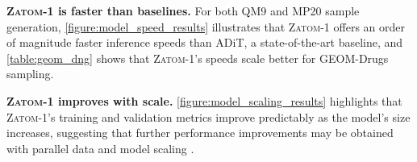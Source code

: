 \documentclass{article}
\theoremstyle{plain}
\theoremstyle{definition}
\theoremstyle{remark}
\begin{document}
\textbf{\textsc{Zatom-1} is faster than baselines.} For both QM9 and MP20 sample generation, \cref{figure:model_speed_results} illustrates that \textsc{Zatom-1} offers an order of magnitude faster inference speeds than ADiT, a state-of-the-art baseline, and \cref{table:geom_dng} shows that \textsc{Zatom-1}'s speeds scale better for GEOM-Drugs sampling.

\textbf{\textsc{Zatom-1} improves with scale.} \cref{figure:model_scaling_results} highlights that \textsc{Zatom-1}'s training and validation metrics improve predictably as the model's size increases, suggesting that further performance improvements may be obtained with parallel data and model scaling \citep{kaplan2020scaling}.


\begin{table}[!ht]
\caption{\textbf{Molecule generation results on GEOM-DRUGS.}
\label{table:geom_dng}
\textit{Left:} Validity, uniqueness, and \% pass rates on PoseBusters for 10,000 sampled molecules.
\textsc{Zatom-1}, using minimal inductive biases, matches or exceeds state-of-the-art equivariant and latent diffusion baselines, which explicitly predict atomic bonds or generate samples using latent autoencoder embeddings, and generates more PoseBusters-valid samples than the recent baseline TABASCO.
\textit{Right:} We plot the number of integration steps for \textsc{Zatom-1}, ADiT, and SemlaFlow vs. time to generate 10,000 molecules on a single NVIDIA GPU. \textsc{Zatom-1} scales competitively with the number of integration steps compared to SemlaFlow, a highly optimized equivariant diffusion model, and ADiT, a non-equivariant latent diffusion model.
}
\vspace{0.5em}


\end{table}
\end{document}
